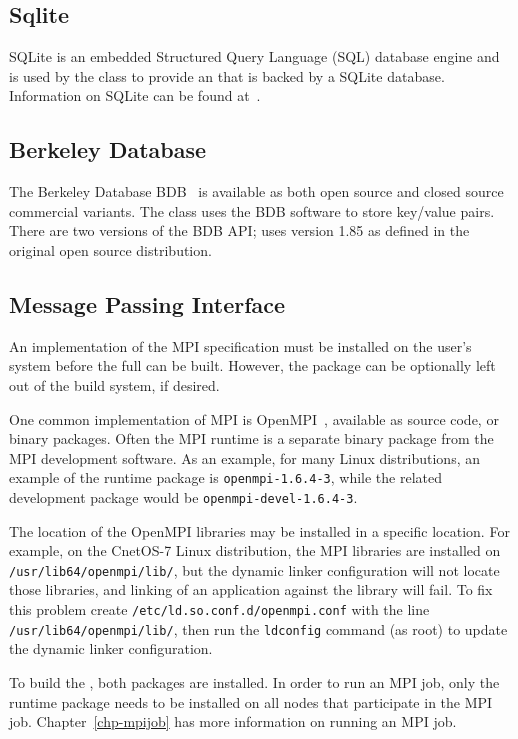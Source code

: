 \subsection{Sqlite}

SQLite is an embedded Structured Query Language (SQL) database engine and is
used by the  class to provide an
 that is backed by a SQLite database. Information
on SQLite can be found at~\cite{sqlite}.

\subsection{Berkeley Database}

The Berkeley Database {BDB}~\cite{berkeleydb} is available as both open source
and closed source commercial variants. The \sname class
 uses the BDB software to store key/value pairs.
There are two versions of the BDB API; \sname uses version 1.85 as defined in
the original open source distribution.

\subsection{Message Passing Interface}

An implementation of the MPI specification must be installed on the user's
system before the full \sname can be built. However, the  package
can be optionally left out of the \sname build system, if desired.

One common implementation of MPI is OpenMPI~\cite{openmpi}, available as source
code, or binary packages. Often the MPI runtime is a separate binary package
from the MPI development software. As an example, for many Linux distributions,
an example of the runtime package is \texttt{openmpi-1.6.4-3}, while
the related development package would be \texttt{openmpi-devel-1.6.4-3}.

The location of the OpenMPI libraries may be installed in a specific location.
For example, on the CnetOS-7 Linux distribution, the MPI libraries are installed
on {\tt /usr/lib64/openmpi/lib/}, but the dynamic linker configuration will
not locate those libraries, and linking of an application against the \sname
library will fail. To fix this problem create
{\tt /etc/ld.so.conf.d/openmpi.conf} with the line
{\tt /usr/lib64/openmpi/lib/}, then run the {\tt ldconfig} command (as root)
to update the dynamic linker configuration.

To build the \sname, both packages are installed. In order to run an MPI
job, only the runtime package needs to be installed on all nodes that
participate in the MPI job. Chapter~\ref{chp-mpijob} has more information on
running an MPI job.
